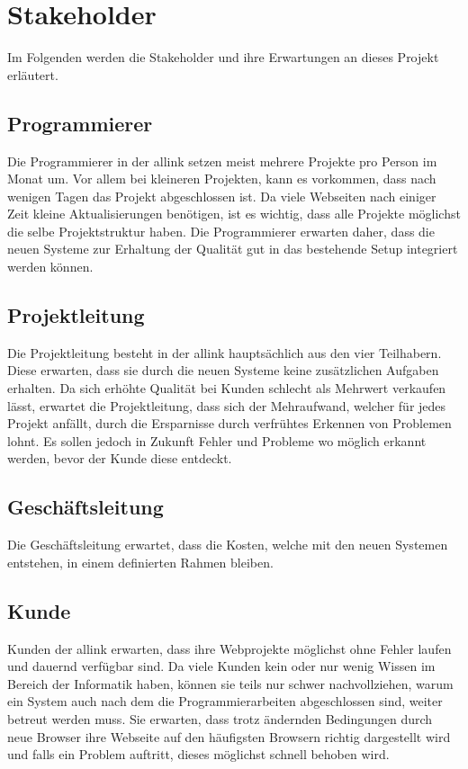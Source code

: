 \section{Stakeholder}
\label{sec:stakeholder}
Im Folgenden werden die Stakeholder und ihre Erwartungen an dieses Projekt erläutert.

\subsection{Programmierer}
\label{sub:programmierer}
Die Programmierer in der allink setzen meist mehrere Projekte pro Person im Monat um. Vor allem bei kleineren Projekten, kann es vorkommen, dass nach wenigen Tagen das Projekt abgeschlossen ist. Da viele Webseiten nach einiger Zeit kleine Aktualisierungen benötigen, ist es wichtig, dass alle Projekte möglichst die selbe Projektstruktur haben. Die Programmierer erwarten daher, dass die neuen Systeme zur Erhaltung der Qualität gut in das bestehende Setup integriert werden können.

\subsection{Projektleitung}
\label{sub:projektleitung}
Die Projektleitung besteht in der allink hauptsächlich aus den vier Teilhabern. Diese erwarten, dass sie durch die neuen Systeme keine zusätzlichen Aufgaben erhalten. Da sich erhöhte Qualität bei Kunden schlecht als Mehrwert verkaufen lässt, erwartet die Projektleitung, dass sich der Mehraufwand, welcher für jedes Projekt anfällt, durch die Ersparnisse durch verfrühtes Erkennen von Problemen lohnt. Es sollen jedoch in Zukunft Fehler und Probleme wo möglich erkannt werden, bevor der Kunde diese entdeckt.

\subsection{Geschäftsleitung}
\label{sub:geschäftsleitung}
Die Geschäftsleitung erwartet, dass die Kosten, welche mit den neuen Systemen entstehen, in einem definierten Rahmen bleiben.

\subsection{Kunde}
\label{sub:kunde}
Kunden der allink erwarten, dass ihre Webprojekte möglichst ohne Fehler laufen und dauernd verfügbar sind. Da viele Kunden kein oder nur wenig Wissen im Bereich der Informatik haben, können sie teils nur schwer nachvollziehen, warum ein System auch nach dem die Programmierarbeiten abgeschlossen sind, weiter betreut werden muss. Sie erwarten, dass trotz ändernden Bedingungen durch neue Browser ihre Webseite auf den häufigsten Browsern richtig dargestellt wird und falls ein Problem auftritt, dieses möglichst schnell behoben wird.

